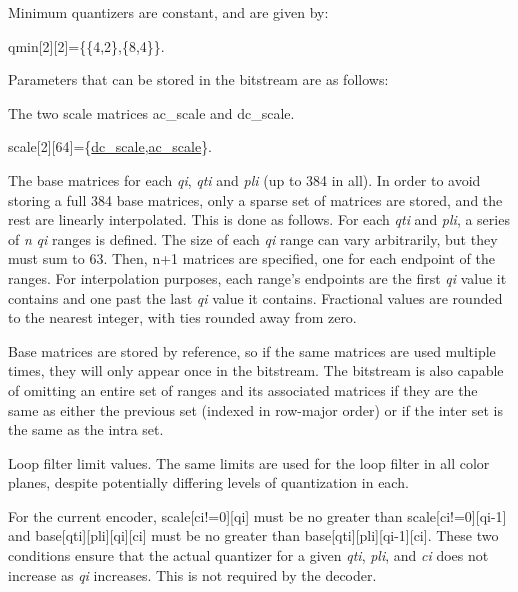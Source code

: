 Minimum quantizers are constant, and are given by\+: 
\begin{DoxyCode}
qmin[2][2]=\{\{4,2\},\{8,4\}\}.
\end{DoxyCode}


Parameters that can be stored in the bitstream are as follows\+:
\begin{DoxyItemize}
\item The two scale matrices ac\+\_\+scale and dc\+\_\+scale. 
\begin{DoxyCode}
scale[2][64]=\{\hyperlink{structth__quant__info_ad5c1c0d1aa4127fcf864ae747d732ed9}{dc\_scale},\hyperlink{structth__quant__info_a102f079c8f4a135dc0895c10768aeb06}{ac\_scale}\}.
\end{DoxyCode}

\item The base matrices for each {\itshape qi}, {\itshape qti} and {\itshape pli} (up to 384 in all). In order to avoid storing a full 384 base matrices, only a sparse set of matrices are stored, and the rest are linearly interpolated. This is done as follows. For each {\itshape qti} and {\itshape pli}, a series of {\itshape n} {\itshape qi} ranges is defined. The size of each {\itshape qi} range can vary arbitrarily, but they must sum to 63. Then, {\ttfamily n+1} matrices are specified, one for each endpoint of the ranges. For interpolation purposes, each range's endpoints are the first {\itshape qi} value it contains and one past the last {\itshape qi} value it contains. Fractional values are rounded to the nearest integer, with ties rounded away from zero.

Base matrices are stored by reference, so if the same matrices are used multiple times, they will only appear once in the bitstream. The bitstream is also capable of omitting an entire set of ranges and its associated matrices if they are the same as either the previous set (indexed in row-\/major order) or if the inter set is the same as the intra set.
\item Loop filter limit values. The same limits are used for the loop filter in all color planes, despite potentially differing levels of quantization in each.
\end{DoxyItemize}

For the current encoder, {\ttfamily scale\mbox{[}ci!=0\mbox{]}\mbox{[}qi\mbox{]}} must be no greater than {\ttfamily scale\mbox{[}ci!=0\mbox{]}\mbox{[}qi-\/1\mbox{]}} and {\ttfamily base\mbox{[}qti\mbox{]}\mbox{[}pli\mbox{]}\mbox{[}qi\mbox{]}\mbox{[}ci\mbox{]}} must be no greater than {\ttfamily base\mbox{[}qti\mbox{]}\mbox{[}pli\mbox{]}\mbox{[}qi-\/1\mbox{]}\mbox{[}ci\mbox{]}}. These two conditions ensure that the actual quantizer for a given {\itshape qti}, {\itshape pli}, and {\itshape ci} does not increase as {\itshape qi} increases. This is not required by the decoder. 

